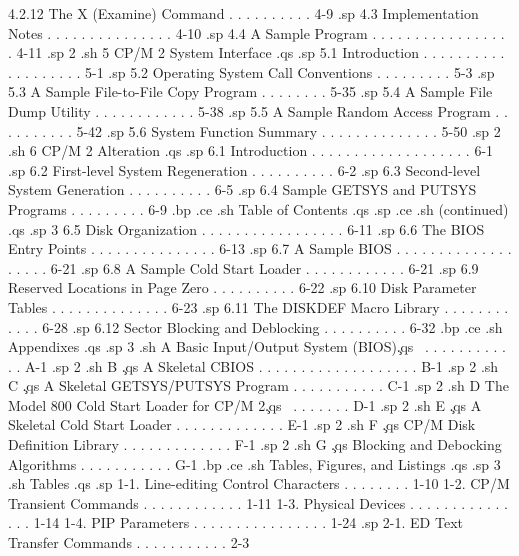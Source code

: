         4.2.12 The X (Examine) Command  . . . . . . . . . .   4-9 
.sp
   4.3  Implementation Notes  . . . . . . . . . . . . . . .  4-10 
.sp
   4.4  A Sample Program  . . . . . . . . . . . . . . . . .  4-11 
.sp 2
.sh
5  CP/M 2 System Interface  
.qs
.sp
   5.1  Introduction  . . . . . . . . . . . . . . . . . . .   5-1 
.sp
   5.2  Operating System Call Conventions . . . . . . . . .   5-3 
.sp
   5.3  A Sample File-to-File Copy Program  . . . . . . . .  5-35 
.sp
   5.4  A Sample File Dump Utility  . . . . . . . . . . . .  5-38 
.sp
   5.5  A Sample Random Access Program  . . . . . . . . . .  5-42 
.sp
   5.6  System Function Summary . . . . . . . . . . . . . .  5-50 
.sp 2
.sh
6  CP/M 2 Alteration  
.qs
.sp
   6.1  Introduction  . . . . . . . . . . . . . . . . . . .   6-1 
.sp
   6.2  First-level System Regeneration . . . . . . . . . .   6-2 
.sp
   6.3  Second-level System Generation  . . . . . . . . . .   6-5 
.sp
   6.4  Sample GETSYS and PUTSYS Programs . . . . . . . . .   6-9 
.bp
.ce
.sh
Table of Contents 
.qs
.sp
.ce
.sh
(continued)
.qs
.sp 3
   6.5  Disk Organization . . . . . . . . . . . . . . . . .  6-11 
.sp
   6.6  The BIOS Entry Points . . . . . . . . . . . . . . .  6-13 
.sp
   6.7  A Sample BIOS . . . . . . . . . . . . . . . . . . .  6-21 
.sp
   6.8  A Sample Cold Start Loader  . . . . . . . . . . . .  6-21 
.sp
   6.9  Reserved Locations in Page Zero . . . . . . . . . .  6-22 
.sp
   6.10  Disk Parameter Tables  . . . . . . . . . . . . . .  6-23 
.sp
   6.11  The DISKDEF Macro Library  . . . . . . . . . . . .  6-28 
.sp
   6.12  Sector Blocking and Deblocking . . . . . . . . . .  6-32 
.bp
.ce
.sh
Appendixes
.qs
.sp 3
.sh
A  Basic Input/Output System (BIOS)\c
.qs
\ . . . . . . . . . . . .   A-1
.sp 2
.sh
B  \c
.qs
A Skeletal CBIOS  . . . . . . . . . . . . . . . . . . .   B-1
.sp 2
.sh
C  \c
.qs
A Skeletal GETSYS/PUTSYS Program  . . . . . . . . . . .   C-1
.sp 2
.sh
D  The Model 800 Cold Start Loader for CP/M 2\c
.qs
\ . . . . . . .   D-1
.sp 2
.sh
E  \c
.qs
A Skeletal Cold Start Loader  . . . . . . . . . . . . .   E-1
.sp 2
.sh
F  \c
.qs
CP/M Disk Definition Library  . . . . . . . . . . . . .   F-1
.sp 2
.sh
G  \c
.qs
Blocking and Debocking Algorithms . . . . . . . . . . .   G-1
.bp
.ce
.sh
Tables, Figures, and Listings
.qs
.sp 3
.sh
Tables
.qs
.sp
     1-1.   Line-editing Control Characters . . . . . . . .  1-10
     1-2.   CP/M Transient Commands . . . . . . . . . . . .  1-11
     1-3.   Physical Devices  . . . . . . . . . . . . . . .  1-14
     1-4.   PIP Parameters  . . . . . . . . . . . . . . . .  1-24
.sp
     2-1.   ED Text Transfer Commands . . . . . . . . . . .   2-3
